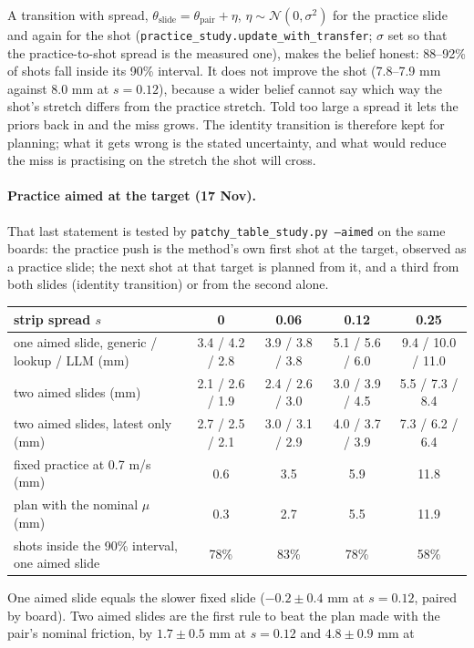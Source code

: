 \documentclass[10pt]{article}
\newcommand{\code}[1]{\texttt{#1}}
\begin{document}
A transition with spread, $\theta_{\text{slide}}=\theta_{\text{pair}}+\eta$, $\eta\sim\mathcal N(0,\sigma^2)$ for the
practice slide and again for the shot (\code{practice\_study.update\_with\_transfer}; $\sigma$ set so that the
practice-to-shot spread is the measured one), makes the belief honest: 88--92\% of shots fall inside its 90\% interval.
It does not improve the shot (7.8--7.9 mm against 8.0 mm at $s=0.12$), because a wider belief cannot say which way the
shot's stretch differs from the practice stretch.  Told too large a spread it lets the priors back in and the miss grows.
The identity transition is therefore kept for planning; what it gets wrong is the stated uncertainty, and what would reduce
the miss is practising on the stretch the shot will cross.

\paragraph{Practice aimed at the target (17 Nov).}  That last statement is tested by
\code{patchy\_table\_study.py --aimed} on the same boards: the practice push is the method's own first shot at the target,
observed as a practice slide; the next shot at that target is planned from it, and a third from both slides (identity
transition) or from the second alone.
\begin{center}\small
\begin{tabular}{@{}lcccc@{}}
\toprule
strip spread $s$ & 0 & 0.06 & 0.12 & 0.25\\
\midrule
one aimed slide, generic / lookup / LLM (mm) & 3.4 / 4.2 / 2.8 & 3.9 / 3.8 / 3.8 & 5.1 / 5.6 / 6.0 & 9.4 / 10.0 / 11.0\\
two aimed slides (mm) & 2.1 / 2.6 / 1.9 & 2.4 / 2.6 / 3.0 & 3.0 / 3.9 / 4.5 & 5.5 / 7.3 / 8.4\\
two aimed slides, latest only (mm) & 2.7 / 2.5 / 2.1 & 3.0 / 3.1 / 2.9 & 4.0 / 3.7 / 3.9 & 7.3 / 6.2 / 6.4\\
fixed practice at 0.7 m/s (mm) & 0.6 & 3.5 & 5.9 & 11.8\\
plan with the nominal $\mu$ (mm) & 0.3 & 2.7 & 5.5 & 11.9\\
shots inside the 90\% interval, one aimed slide & 78\% & 83\% & 78\% & 58\%\\
\bottomrule
\end{tabular}
\end{center}
One aimed slide equals the slower fixed slide ($-0.2\pm0.4$ mm at $s=0.12$, paired by board).  Two aimed slides are the
first rule to beat the plan made with the pair's nominal friction, by $1.7\pm0.5$ mm at $s=0.12$ and $4.8\pm0.9$ mm at
\end{document}
